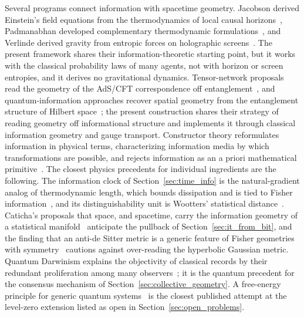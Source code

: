 \documentclass[11pt]{article}
\begin{document}
Several programs connect information with spacetime geometry. Jacobson derived Einstein's field equations from the thermodynamics of local causal horizons~\cite{Jacobson1995}, Padmanabhan developed complementary thermodynamic formulations~\cite{Padmanabhan2010}, and Verlinde derived gravity from entropic forces on holographic screens~\cite{Verlinde2011}. The present framework shares their information-theoretic starting point, but it works with the classical probability laws of many agents, not with horizon or screen entropies, and it derives no gravitational dynamics. Tensor-network proposals read the geometry of the AdS/CFT correspondence off entanglement~\cite{Swingle2012}, and quantum-information approaches recover spatial geometry from the entanglement structure of Hilbert space~\cite{Cao2017}; the present construction shares their strategy of reading geometry off informational structure and implements it through classical information geometry and gauge transport. Constructor theory reformulates information in physical terms, characterizing information media by which transformations are possible, and rejects information as an a priori mathematical primitive~\cite{Deutsch2015}. The closest physics precedents for individual ingredients are the following. The information clock of Section~\ref{sec:time_info} is the natural-gradient analog of thermodynamic length, which bounds dissipation and is tied to Fisher information~\cite{SalamonBerry1983, Crooks2007}, and its distinguishability unit is Wootters' statistical distance~\cite{Wootters1981}. Caticha's proposals that space, and spacetime, carry the information geometry of a statistical manifold~\cite{Caticha2005, Caticha2019spacetime} anticipate the pullback of Section~\ref{sec:it_from_bit}, and the finding that an anti-de Sitter metric is a generic feature of Fisher geometries with symmetry~\cite{ErdmengerGrosvenorJefferson2020} cautions against over-reading the hyperbolic Gaussian metric. Quantum Darwinism explains the objectivity of classical records by their redundant proliferation among many observers~\cite{Zurek2009}; it is the quantum precedent for the consensus mechanism of Section~\ref{sec:collective_geometry}. A free-energy principle for generic quantum systems~\cite{Fields2022} is the closest published attempt at the level-zero extension listed as open in Section~\ref{sec:open_problems}.
\end{document}
